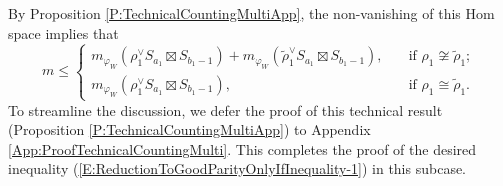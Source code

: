 \documentclass[11pt,letterpaper]{amsart}
\theoremstyle{plain}
\numberwithin{theorem}{section}
\numberwithin{equation}{subsection}
\theoremstyle{remark}
\begin{document}
By Proposition \ref{P:TechnicalCountingMultiApp}, the non-vanishing of this Hom space implies that
\[
    m\leq\begin{cases}
        m_{\varphi_W}\left(\rho_1^\vee S_{a_1}\boxtimes S_{b_1-1}\right) + m_{\varphi_W}\left(\widetilde{\rho}_1^\vee S_{a_1}\boxtimes S_{b_1-1}\right), \quad &\text{if } \rho_1\not\cong\widetilde{\rho}_1;\\
        m_{\varphi_W}\left(\rho_1^\vee S_{a_1}\boxtimes S_{b_1-1}\right), \quad &\text{if }\rho_1\cong\widetilde{\rho}_1.
    \end{cases}
\]
To streamline the discussion, we defer the proof of this technical result (Proposition \ref{P:TechnicalCountingMultiApp}) to Appendix \ref{App:ProofTechnicalCountingMulti}. This completes the proof of the desired inequality (\ref{E:ReductionToGoodParityOnlyIfInequality-1}) in this subcase.

\vskip 5pt
\end{document}
